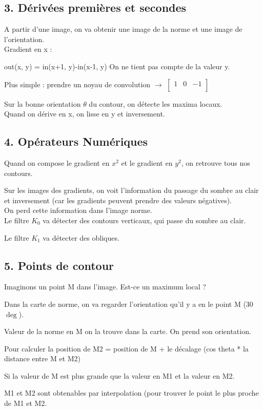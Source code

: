 \documentclass{report}
\begin{document}
	\subsection*{3. Dérivées premières et secondes}
	
A partir d'une image, on va obtenir une image de la norme et une image de l'orientation.\\

Gradient en x :

out(x, y) = in(x+1, y)-in(x-1, y)        On ne tient pas compte de la valeur y.

Plus simple : prendre un noyau de convolution $\rightarrow$
$
\begin{bmatrix}
1 & 0 & -1\\
\end{bmatrix}
$

Sur la bonne orientation $\theta$ du contour, on détecte les maxima locaux.\\

Quand on dérive en x, on lisse en y et inversement.
	\subsection*{4. Opérateurs Numériques}
	
Quand on compose le gradient en $x^{2}$ et le gradient en $y^{2}$, on retrouve tous nos contours.

Sur les images des gradients, on voit l'information du passage du sombre au clair et inversement (car les gradients peuvent prendre des valeurs négatives).\\

On perd cette information dans l'image norme.\\

Le filtre $K_{0}$ va détecter des contours verticaux, qui passe du sombre au clair.

Le filtre $K_{1}$ va détecter des obliques.

	\subsection*{5. Points de contour}
	
Imaginons un point M dans l'image. Est-ce un maximum local ?

Dans la carte de norme, on va regarder l'orientation qu'il y a en le point M (30 $\deg$).

Valeur de la norme en M on la trouve dans la carte. On prend son orientation.

Pour calculer la position de M2 = position de M + le décalage (cos theta * la distance entre M et M2)

Si la valeur de M est plus grande que la valeur en M1 et la valeur en M2.

M1 et M2 sont obtenables par interpolation (pour trouver le point le plus proche de M1 et M2.	
\end{document}
